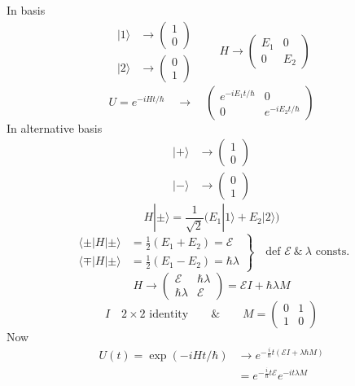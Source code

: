\documentclass[11pt,a4paper]{article}
\begin{document}
In basis
\[
    \begin{aligned}
        |1\rangle&\to\begin{pmatrix}1\\0\end{pmatrix}\\
        |2\rangle&\to\begin{pmatrix}0\\1\end{pmatrix}
    \end{aligned}
    \qquad H\to\begin{pmatrix}E_1&0\\0&E_2\end{pmatrix}
\]
\[
    U=e^{-iHt/\hbar}\quad\to\quad
    \begin{pmatrix}e^{-iE_1t/\hbar}&0\\0&e^{-iE_2t/\hbar}\end{pmatrix}
\]
In alternative basis
\[
    \begin{aligned}
        |+\rangle&\to\begin{pmatrix}1\\0\end{pmatrix}\\
        |-\rangle&\to\begin{pmatrix}0\\1\end{pmatrix}
    \end{aligned}
\]
\[
    H|\pm\rangle=\frac{1}{\sqrt{2}}\bigl(E_1|1\rangle+E_2|2\rangle\bigr)
\]
\[
    \left.\begin{aligned}
        \langle\pm|H|\pm\rangle&=\frac{1}{2}(E_1+E_2)=\mathcal{E}\\
        \langle\mp|H|\pm\rangle&=\frac{1}{2}(E_1-E_2)=\hbar\lambda
    \end{aligned}\right\}\quad\text{def }\mathcal{E}\ \&\ \lambda\text{ consts.}
\]
\[
    H\to\begin{pmatrix}\mathcal{E}&\hbar\lambda\\\hbar\lambda&\mathcal{E}\end{pmatrix}
    =\mathcal{E}I+\hbar\lambda M
\]
\[
    I\quad 2\times2\text{ identity}
    \qquad\&\qquad M=\begin{pmatrix}0&1\\1&0\end{pmatrix}
\]
Now
\begin{align*}
    U(t)=\exp(-iHt/\hbar)&\to e^{-\frac{i}{\hbar}t(\mathcal{E}I+\lambda\hbar M)}\\
    &=e^{-\frac{i}{\hbar}t\mathcal{E}}e^{-it\lambda M}
\end{align*}
\end{document}
